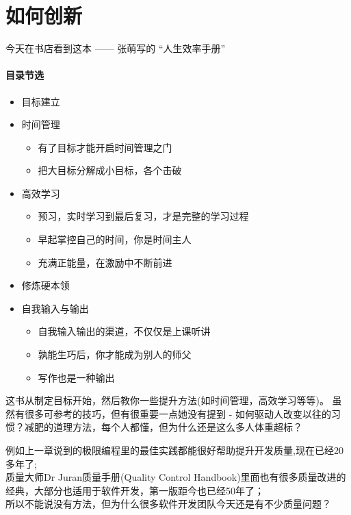 

\chapter{如何创新} %


今天在书店看到这本 ------ 张萌写的 ``人生效率手册''

\hypertarget{ux76eeux5f55ux8282ux9009}{%
\subsubsection{目录节选}\label{ux76eeux5f55ux8282ux9009}}

\begin{itemize}
\tightlist
\item
  目标建立
\item
  时间管理

  \begin{itemize}
  \tightlist
  \item
    有了目标才能开启时间管理之门
  \item
    把大目标分解成小目标，各个击破
  \end{itemize}
\item
  高效学习

  \begin{itemize}
  \tightlist
  \item
    预习，实时学习到最后复习，才是完整的学习过程
  \item
    早起掌控自己的时间，你是时间主人
  \item
    充满正能量，在激励中不断前进
  \end{itemize}
\item
  修炼硬本领
\item
  自我输入与输出

  \begin{itemize}
  \tightlist
  \item
    自我输入输出的渠道，不仅仅是上课听讲
  \item
    孰能生巧后，你才能成为别人的师父
  \item
    写作也是一种输出
  \end{itemize}
\end{itemize}

这书从制定目标开始，然后教你一些提升方法(如时间管理，高效学习等等)。
虽然有很多可参考的技巧，但有很重要一点她没有提到 -
如何驱动人改变以往的习惯？减肥的道理方法，每个人都懂，但为什么还是这么多人体重超标？

例如上一章说到的极限编程里的最佳实践都能很好帮助提升开发质量,现在已经20多年了;\\
质量大师Dr Juran质量手册(Quality Control
Handbook)里面也有很多质量改进的经典，大部分也适用于软件开发，第一版距今也已经50年了；\\
所以不能说没有方法，但为什么很多软件开发团队今天还是有不少质量问题？

